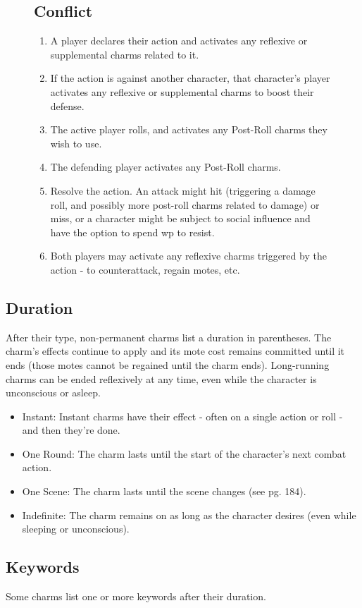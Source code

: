 \documentclass[oneside]{book}
\newlength{\sidewidth}
\newenvironment{sidebarPartial}[2][]{%
   \def\imgcmd{\texttt{[image: \#2]}}%
   \begin{lrbox}{\mysavebox}%
   \begin{minipage}%
}{%
   \end{minipage}
   \end{lrbox}%
   \sbox\mysavebox{\fbox{\usebox\mysavebox}}%
   \mbox{\rlap{\raisebox{-\dp\mysavebox}{\imgcmd}}\usebox\mysavebox}%
}
\newenvironment{sidebar}[1]{%
  \begin{figure}[tb]%
  \begin{sidebarPartial}{resources/bg-sidebar.jpg}{\textwidth}%
  \vspace{6pt}
  \subsection*{#1}\vspace{6pt}%
  \centering
  \begin{minipage}{\sidewidth}
}
{
  \end{minipage}
  \vspace{6pt}
  \end{sidebarPartial}
  \end{figure}
}
\begin{document}
\begin{multicols}{2}
\begin{sidebar}{Conflict}
  \begin{enumerate}
    \item A player declares their action and activates any reflexive or supplemental charms related to it.
    \item If the action is against another character, that character's player activates any reflexive or supplemental charms to boost their defense.
    \item The active player rolls, and activates any Post-Roll charms they wish to use.
    \item The defending player activates any Post-Roll charms.
    \item Resolve the action. An attack might hit (triggering a damage roll, and possibly more post-roll charms related to damage) or miss, or a character might be subject to social influence and have the option to spend wp to resist.
    \item Both players may activate any reflexive charms triggered by the action - to counterattack, regain motes, etc.
  \end{enumerate}
\end{sidebar}

\subsection*{Duration}
\par After their type, non-permanent charms list a duration in parentheses. The charm's effects continue to apply and its mote cost remains committed until it ends (those motes cannot be regained until the charm ends). Long-running charms can be ended reflexively at any time, even while the character is unconscious or asleep.

\begin{itemize}
  \item Instant: Instant charms have their effect - often on a single action or roll - and then they're done.
  \item One Round: The charm lasts until the start of the character's next combat action.
  \item One Scene: The charm lasts until the scene changes (see pg. 184).
  \item Indefinite: The charm remains on as long as the character desires (even while sleeping or unconscious).
\end{itemize}

\subsection*{Keywords}
\par Some charms list one or more keywords after their duration.


\end{multicols}
\end{document}
